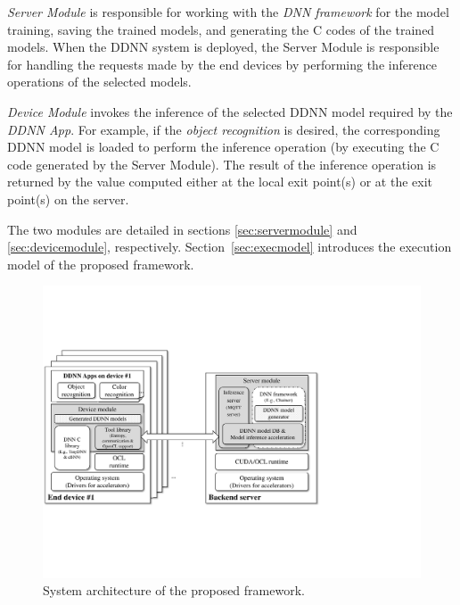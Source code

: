 \documentclass[conference]{IEEEtran}
\def\sectionname{Section}
\begin{document}
\emph{Server Module} is responsible for working with the \emph{DNN framework} for the model training, saving the trained models, and generating the C codes of the trained models. When the DDNN system is deployed, the Server Module is responsible for handling the requests made by the end devices by performing the inference operations of the selected models.

\emph{Device Module} invokes the inference of the selected DDNN model required by the \emph{DDNN App}. For example, if the \emph{object recognition} is desired, the corresponding DDNN model is loaded to perform the inference operation (by executing the C code generated by the Server Module). The result of the inference operation is returned by the value computed either at the local exit point(s) or at the exit point(s) on the server.

The two modules are detailed in sections \ref{sec:servermodule} and \ref{sec:devicemodule}, respectively. \sectionname~\ref{sec:execmodel} introduces the execution model of the proposed framework.


	
    \begin{figure}[tbh]
        \centering
        \includegraphics[width=.9\columnwidth]{figure/DDNNCF}
        \caption{System architecture of the proposed framework.}
        \label{fig:systemarchitecture} %
    \end{figure}
\end{document}
